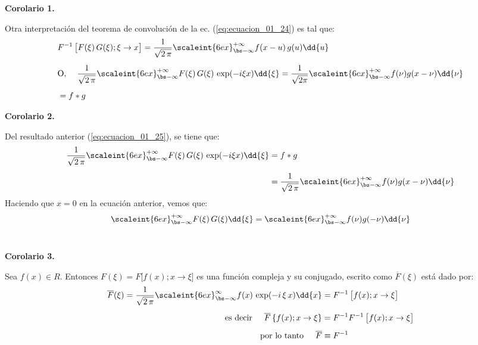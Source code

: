 \textbf{Corolario 1.}

Otra interpretación del teorema de convolución de la ec. (\ref{eq:ecuacion_01_24}) es tal que:
\begin{align}
\begin{aligned}[b]
&F^{-1} \, \big[F(\xi) \, G(\xi); \xi \to x\big] = \dfrac{1}{\sqrt{2 \, \pi}} \scaleint{6ex}_{\bs -\infty}^{+\infty} f(x - u) \, g(u) \dd{u} \\[0.5em]
&\mbox{O}, \hspace{0.4cm} \dfrac{1}{\sqrt{2 \, \pi}} \scaleint{6ex}_{\bs -\infty}^{+\infty} F(\xi) \, G(\xi) \, \exp(- i \xi x) \dd{\xi} = \dfrac{1}{\sqrt{2 \pi}} \scaleint{6ex}_{\bs -\infty}^{+\infty} f(\nu) g(x - \nu) \dd{\nu} \\[0.5em]
&= f * g
\end{aligned}
\label{eq:ecuacion_01_25}
\end{align}

\textbf{Corolario 2.}

Del resultado anterior (\ref{eq:ecuacion_01_25}), se tiene que:
\begin{align*}
\dfrac{1}{\sqrt{2 \, \pi}} \scaleint{6ex}_{\bs -\infty}^{+\infty} F(\xi) \, G(\xi) \, \exp(- i \xi x) \dd{\xi} &= f * g \\[0.5em]
&= \dfrac{1}{\sqrt{2 \, \pi}} \scaleint{6ex}_{\bs -\infty}^{+\infty} f(\nu) g(x - \nu) \dd{\nu}
\end{align*}
Haciendo que $x = 0$ en la ecuación anterior, vemos que:
\begin{align}
\scaleint{6ex}_{\bs -\infty}^{+\infty} F(\xi) \, G(\xi) \dd{\xi} = \scaleint{6ex}_{\bs -\infty}^{+\infty} f(\nu) g(-\nu) \dd{\nu}
\label{eq:ecuacion_01_26}
\end{align}
\\
\bigskip

\textbf{Corolario 3.}

Sea $f(x) \in R$. Entonces $F(\xi) = F \big[f(x); x \to \xi\big]$ es una función compleja y su conjugado, escrito como $\overline{F}(\xi)$ está dado por:
\begin{align}
\begin{aligned}[b]
\overline{F}(\xi) = \dfrac{1}{\sqrt{2 \, \pi}} \scaleint{6ex}_{\bs -\infty}^{\infty} f(x) \, \exp(-i \, \xi \, x) \dd{x} &= F^{-1} \, \big[f(x); x \to \xi\big] \\[0.5em]
\mbox{es decir} \hspace{0.5cm} \overline{F} \left\{f(x); x \to \xi \right\} &= F^{-1} F^{-1} \, \big[f(x); x \to \xi \big] \\[0.5em]
\mbox{por lo tanto} \hspace{0.5cm} \overline{F} &\equiv F^{-1}
\end{aligned}
\label{eq:ecuacion_01_27}
\end{align}
\\
\bigskip

